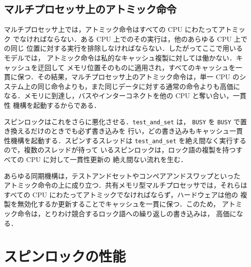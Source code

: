 \documentclass[../main.tex]{subfiles}
\begin{document}
\subsection{マルチプロセッサ上のアトミック命令}

マルチプロセッサ上では，アトミック命令はすべての CPU にわたってアトミック
でなければならない．ある CPU 上でのその実行は，他のあらゆる CPU 上での同じ
位置に対する実行を排除しなければならない．したがってここで用いるモデルでは，
アトミック命令は私的なキャッシュ複製に対しては働かない．キャッシュを迂回して
メモリ位置そのものに適用され，すべてのキャッシュを一貫に保つ．その結果，マルチプロセッサ上のアトミック命令は，単一 CPU
のシステム上の同じ命令よりも，また同じデータに対する通常の命令よりも高価に
なる．メモリに到達し，バスやインターコネクトを他の CPU と奪い合い，一貫性
機構を起動するからである．

スピンロックはこれをさらに悪化させる．\texttt{test\_and\_set} は，
\texttt{BUSY} を \texttt{BUSY} で置き換えるだけのときでも必ず書き込みを
行い，どの書き込みもキャッシュ一貫性機構を起動する．スピンするスレッドは
\texttt{test\_and\_set} を絶え間なく実行するので，複数のスレッドが待って
いるスピンロックは，ロック語の複製を持つすべての CPU に対して一貫性更新の
絶え間ない流れを生む．

\begin{keypoint}
  あらゆる同期機構は，テストアンドセットやコンペアアンドスワップといった
  アトミック命令の上に成り立つ．共有メモリ型マルチプロセッサでは，それらは
  すべての CPU にわたってアトミックでなければならず，ハードウェアは他の
  複製を無効化するか更新することでキャッシュを一貫に保つ．このため，
  アトミック命令は，とりわけ競合するロック語への繰り返しの書き込みは，
  高価になる．
\end{keypoint}

\section{スピンロックの性能}
\label{sec:l10-spin-perf}
\end{document}

